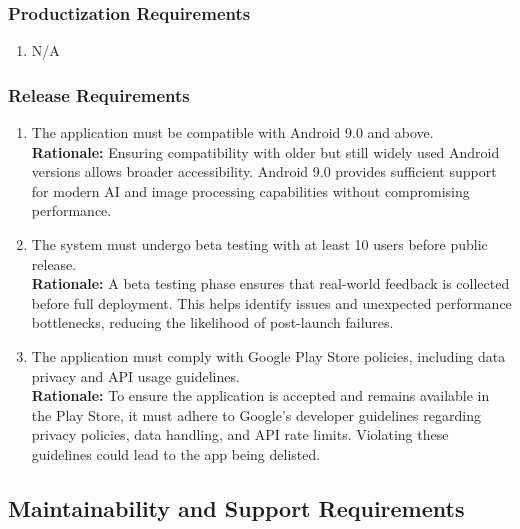 \documentclass[]{article}
\begin{document}
\subsubsection{Productization Requirements}
\label{ssub:productization_requirements}
\begin{enumerate}[label={OE-P\arabic*.}]
    \item N/A
\end{enumerate}

\subsubsection{Release Requirements}
\label{ssub:release_requirements}
\begin{enumerate}[label={OE-R\arabic*.}]
    \item The application must be compatible with Android 9.0 and above.\\
	\textbf{Rationale:} Ensuring compatibility with older but still widely used Android versions allows broader accessibility. Android 9.0 provides sufficient support for modern AI and image processing capabilities without compromising performance.
	\item The system must undergo beta testing with at least 10 users before public release.\\	
	\textbf{Rationale:} A beta testing phase ensures that real-world feedback is collected before full deployment. This helps identify issues and unexpected performance bottlenecks, reducing the likelihood of post-launch failures.
	\item The application must comply with Google Play Store policies, including data privacy and API usage guidelines.\\	
	\textbf{Rationale:} To ensure the application is accepted and remains available in the Play Store, it must adhere to Google’s developer guidelines regarding privacy policies, data handling, and API rate limits. Violating these guidelines could lead to the app being delisted.
\end{enumerate}


\subsection{Maintainability and Support Requirements}
\label{sub:maintainability_and_support_requirements}
\end{document}
